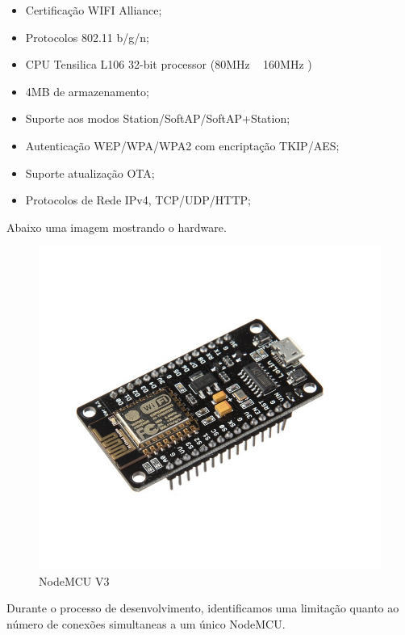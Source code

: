 \documentclass[openright]{normas-utf-tex} %
\begin{document}
\begin{itemize}
    \item Certificação WIFI Alliance;  \cite{espressif}
    \item Protocolos 802.11 b/g/n;\cite{espressif}
    \item CPU Tensilica L106 32-bit processor (80MHz ~ 160MHz )  \cite{Novatec}
    \item 4MB de armazenamento;
    \item Suporte aos modos Station/SoftAP/SoftAP+Station;\cite{espressif}
    \item Autenticação WEP/WPA/WPA2 com encriptação TKIP/AES;\cite{espressif}
    \item Suporte atualização OTA;\cite{espressif}
    \item Protocolos de Rede IPv4, TCP/UDP/HTTP;\cite{espressif}
\end{itemize}

Abaixo uma imagem mostrando o hardware.

\begin{figure}[h!b]
\centering 
\includegraphics[scale=0.5]{nodemcu.jpg}
\caption{NodeMCU V3}
\label{NodeMCU}
\end{figure}

Durante o processo de desenvolvimento, identificamos uma limitação quanto ao número de conexões simultaneas a um único NodeMCU. 
\end{document}
